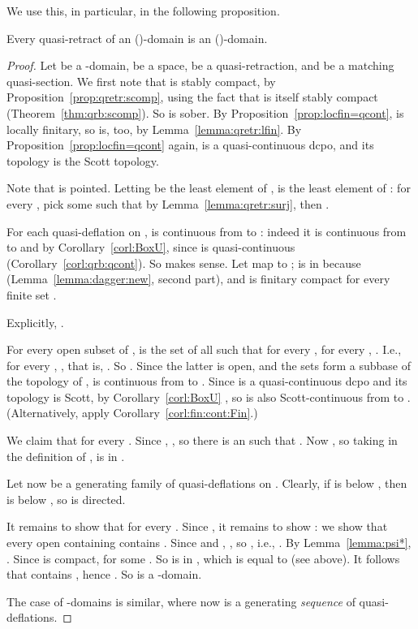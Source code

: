 \documentclass{LMCS}
\begin{document}
We use this, in particular, in the following proposition.
\begin{prop}
  \label{prop:qretr:qrb}
  Every  quasi-retract of an ()-domain is an
  ()-domain.
\end{prop}
\begin{proof}
  Let  be a -domain,  be a  space,  be a
  quasi-retraction, and  be a matching
  quasi-section.  We first note that  is stably compact, by
  Proposition~\ref{prop:qretr:scomp}, using the fact that  is
  itself stably compact (Theorem~\ref{thm:qrb:scomp}).  So  is
  sober. By Proposition~\ref{prop:locfin=qcont},  is locally finitary, so
   is, too, by Lemma~\ref{lemma:qretr:lfin}.  By
  Proposition~\ref{prop:locfin=qcont} again,  is a quasi-continuous
  dcpo, and its topology is the Scott topology.

  Note that  is pointed.  Letting  be the least element of
  ,  is the least element of : for every ,
  pick some  such that  by
  Lemma~\ref{lemma:qretr:surj}, then .

  For each quasi-deflation  on ,  is continuous
  from  to : indeed it is continuous from  to
   and  by
  Corollary~\ref{corl:BoxU}, since  is quasi-continuous
  (Corollary~\ref{corl:qrb:qcont}).  So  makes sense.
  Let  map  to ;  is in 
  because 
  (Lemma~\ref{lemma:dagger:new}, second part), and  is finitary compact for every finite
  set .

  Explicitly, .


  For every open subset  of ,  is
  the set of all  such that for every , for
  every , .  I.e., for every , , that is, .  So .  Since
  the latter is open, and the sets  form a subbase of the
  topology of ,  is continuous from  to
  .  Since  is a quasi-continuous dcpo and its
  topology is Scott, by Corollary~\ref{corl:BoxU} , so  is also Scott-continuous from 
  to .  (Alternatively, apply Corollary~\ref{corl:fin:cont:Fin}.)

  We claim that  for every .
  Since , , so
  there is an  such that .  Now , so taking  in the definition of
  ,  is in .

  Let now  be a generating family of
  quasi-deflations on .  Clearly, if  is below
  , then  is below ,
  so  is directed.

  It remains to show that  for every .  Since , it remains to show : we show
  that every open  containing  contains .  Since  and , , so , i.e., . By Lemma~\ref{lemma:psi*}, .  Since  is
  compact,  for
  some .  So  is in , which is equal to 
  (see above).  It follows that  contains ,
  hence .  So 
  is a -domain.

  The case of -domains is similar, where now
   is a generating {\em sequence\/} of
  quasi-deflations.
\end{proof}
\end{document}

